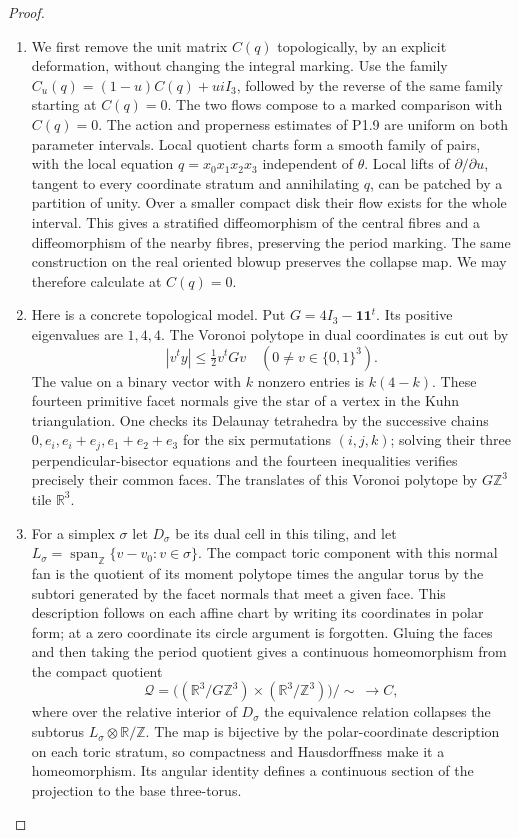 \begin{proof}
\begin{enumerate}[label=\arabic*.]
\item We first remove the unit matrix $C(q)$ topologically, by an explicit
deformation, without changing the integral marking.  Use the family
$C_u(q)=(1-u)C(q)+u iI_3$, followed by the reverse of the same
family starting at $C(q)=0$.  The two flows compose to a marked
comparison with $C(q)=0$.  The action and properness estimates
of P1.9 are uniform on both parameter intervals.  Local quotient charts form a smooth
family of pairs, with the local equation $q=x_0x_1x_2x_3$ independent
of $\theta$.  Local lifts of $\partial/\partial u$, tangent to every
coordinate stratum and annihilating $q$, can be patched by a partition
of unity.  Over a smaller compact disk their flow exists for the whole
interval.  This gives a stratified diffeomorphism of the central
fibres and a diffeomorphism of the nearby fibres, preserving the
period marking.  The same construction on the real oriented blowup
preserves the collapse map.  We may therefore calculate at $C(q)=0$.

\item Here is a concrete topological model.  Put $G=4I_3-\mathbf1\mathbf1^t$.
Its positive eigenvalues are $1,4,4$.  The Voronoi polytope in dual
coordinates is cut out by
\[
|v^ty|\leq \tfrac12v^tGv
 \quad (0\ne v\in\{0,1\}^3).
\]
The value on a binary vector with $k$ nonzero entries is $k(4-k)$.
These fourteen primitive facet normals give the star of a vertex in
the Kuhn triangulation.  One checks its Delaunay tetrahedra by the
successive chains
$0,e_i,e_i+e_j,e_1+e_2+e_3$ for the six permutations $(i,j,k)$;
solving their three perpendicular-bisector equations and the fourteen
inequalities verifies precisely their common faces.  The translates
of this Voronoi polytope by $G\mathbb Z^3$ tile $\mathbb R^3$.

\item For a simplex $\sigma$ let $D_\sigma$ be its dual cell in this tiling,
and let
$L_\sigma=\operatorname{span}_{\mathbb Z}\{v-v_0:v\in\sigma\}$.
The compact toric component with this normal fan is the quotient of
its moment polytope times the angular torus by the subtori generated
by the facet normals that meet a given face.  This description follows
on each affine chart by writing its coordinates in polar form;
at a zero coordinate its circle argument is forgotten.  Gluing the
faces and then taking the period quotient gives a continuous
homeomorphism from the compact quotient
\[
\mathcal Q=
\bigl((\mathbb R^3/G\mathbb Z^3)\times
       (\mathbb R^3/\mathbb Z^3)\bigr)/\!\sim\ \longrightarrow C,
\]
where over the relative interior of $D_\sigma$ the equivalence
relation collapses the subtorus $L_\sigma\otimes\mathbb R/\mathbb Z$.
The map is bijective by the polar-coordinate description on each
toric stratum, so compactness and Hausdorffness make it a homeomorphism.
Its angular identity defines a continuous section of the projection to
the base three-torus.


\end{enumerate}
\end{proof}
